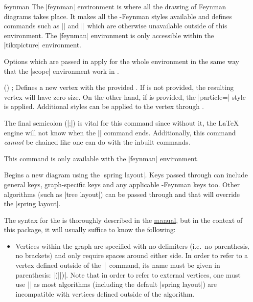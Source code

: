 \documentclass[a4paper,final]{ltxdoc}
\providecommand{\tikzfeynmanname}{\tikzname-Feynman}
\providecommand{\pgfmanual}{\href{http://mirrors.ctan.org/graphics/pgf/base/doc/pgfmanual.pdf}{\tikzname{} manual}}
\begin{document}
\begin{environment}{{feynman}}
  The |{feynman}| environment is where all the drawing of Feynman diagrams takes
  place.  It makes all the \tikzfeynmanname{} styles available and defines
  commands such as |\vertex| and |\diagram| which are otherwise unavailable
  outside of this environment.  The |{feynman}| environment is only accessible
  within the |{tikzpicture}| environment.

  Options which are passed in  apply for the whole environment in
  the same way that the |{scope}| environment work in \tikzname.

  \begin{command}{\vertex{} ()  ;}
    Defines a new vertex with the provided .  If  is
    not provided, the resulting vertex will have zero size.  On the other hand,
    if  is provided, the |particle=| style is
    applied.  Additional styles can be applied to the vertex through
    .

    The final semicolon (|;|) is vital for this command since without it, the
    \LaTeX{} engine will not know when the |\vertex| command ends.
    Additionally, this command \emph{cannot} be chained like one can do with the
    inbuilt \tikzname{} commands.

    This command is only available with the |{feynman}| environment.
  \end{command}

  \begin{command}{\diagram{}}
    Begins a new diagram using the |spring layout|.  Keys passed through
     can include general \tikzname{} keys, graph-specific keys and
    any applicable \tikzfeynmanname{} keys too.  Other algorithms (such as |tree
    layout|) can be passed through  and that will override the
    |spring layout|.

    The syntax for the  is thoroughly described in
    the \pgfmanual, but in the context of this package, it will usually suffice
    to know the following:
    \begin{itemize}
    \item Vertices within the graph are specified with no delimiters (i.e.~no
      parenthesis, no brackets) and only require spaces around either side.  In
      order to refer to a vertex defined outside of the |\diagram| command, its
      name must be given in parenthesis: |(||)|.  Note that in order
      to refer to external vertices, one must use |\diagram*| as most algorithms
      (including the default |spring layout|) are incompatible with vertices
      defined outside of the algorithm.


\end{itemize}
\end{command}
\end{environment}
\end{document}
